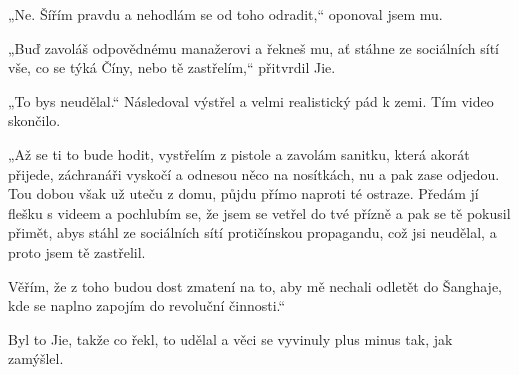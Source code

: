 {„Ne. Šířím pravdu a nehodlám se od toho odradit,“ oponoval jsem mu.

„Buď zavoláš odpovědnému manažerovi a řekneš mu, ať stáhne ze sociálních sítí vše, co se týká Číny, nebo tě zastřelím,“ přitvrdil Jie.

„To bys neudělal.“ Následoval výstřel a velmi realistický pád k zemi. Tím video skončilo.

„Až se ti to bude hodit, vystřelím z pistole a zavolám sanitku, která akorát přijede, záchranáři vyskočí a odnesou něco na nosítkách, nu a pak zase odjedou. Tou dobou však už uteču z domu, půjdu přímo naproti té ostraze. Předám jí flešku s videem a pochlubím se, že jsem se vetřel do tvé přízně a pak se tě pokusil přimět, abys stáhl ze sociálních sítí protičínskou propagandu, což jsi neudělal, a proto jsem tě zastřelil.

Věřím, že z toho budou dost zmatení na to, aby mě nechali odletět do Šanghaje, kde se naplno zapojím do revoluční činnosti.“

Byl to Jie, takže co řekl, to udělal a věci se vyvinuly plus minus tak, jak zamýšlel.}
